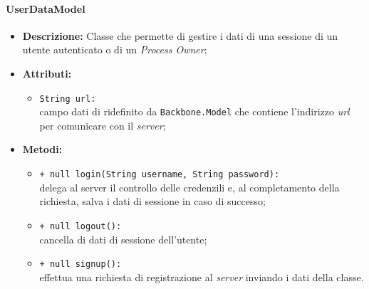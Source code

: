 \paragraph{UserDataModel}
\label{userDataModel}
\begin{flushleft}
\begin{itemize}
\item \textbf{Descrizione:} Classe che permette di gestire i dati di una sessione di un utente autenticato o di un \textit{Process Owner};
\item \textbf{Attributi:}
\begin{sloppypar}
\begin{itemize}
\item \texttt{String url:}\\ campo dati di ridefinito da \texttt{Backbone.Model} che contiene l'indirizzo \textit{url} per comunicare con il \textit{server};
\end{itemize}
\end{sloppypar}
\item \textbf{Metodi:}
\begin{sloppypar}
\begin{itemize}
\item \texttt{+ null login(String username, String password):}\\ delega al server il controllo delle credenzili e, al completamento della richiesta, salva i dati di sessione in caso di successo;
\item \texttt{+ null logout():}\\ cancella di dati di sessione dell'utente;
\item \texttt{+ null signup():}\\ effettua una richiesta di registrazione al \textit{server} inviando i dati della classe.
\end{itemize}
\end{sloppypar}
\end{itemize}
\end{flushleft}

